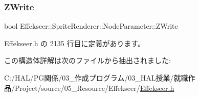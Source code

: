\subsubsection{\texorpdfstring{Z\+Write}{ZWrite}}
{\footnotesize\ttfamily bool Effekseer\+::\+Sprite\+Renderer\+::\+Node\+Parameter\+::\+Z\+Write}



 Effekseer.\+h の 2135 行目に定義があります。



この構造体詳解は次のファイルから抽出されました\+:\begin{DoxyCompactItemize}
\item 
C\+:/\+H\+A\+L/\+P\+G関係/03\+\_\+作成プログラム/03\+\_\+\+H\+A\+L授業/就職作品/\+Project/source/05\+\_\+\+Resource/\+Effekseer/\mbox{\hyperlink{_effekseer_8h}{Effekseer.\+h}}\end{DoxyCompactItemize}
